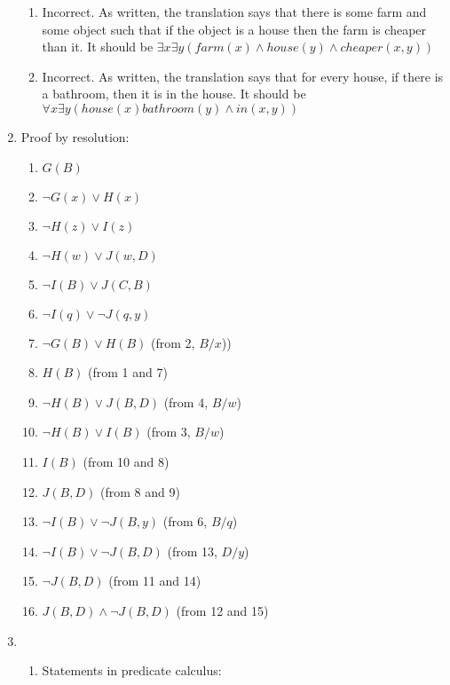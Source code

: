 \documentclass[11pt]{article}
\begin{document}
\begin{enumerate}[label=\bfseries Question \arabic*:]
\begin{enumerate}
  \item Incorrect.  As written, the translation says that there is
    some farm and some object such that if the object is a house then
    the farm is cheaper than it. It should be
    \(\exists x \exists y (farm(x) \land house(y) \land cheaper(x,
    y))\)
  \item Incorrect.  As written, the translation says that for every
    house, if there is a bathroom, then it is in the house.  It should
    be \(\forall x \exists y (house(x) bathroom(y) \land in(x, y))\)
  \end{enumerate}
\item Proof by resolution:
  \begin{enumerate}[label=\arabic*.]
  \item \(G(B)\)
  \item \(\lnot G(x) \lor H(x)\)
  \item \(\lnot H(z) \lor I(z)\)
  \item \(\lnot H(w) \lor J(w, D)\)
  \item \(\lnot I(B) \lor J(C, B)\)
  \item \(\lnot I(q) \lor \lnot J(q, y)\)
  \item \(\lnot G(B) \lor H(B)\) (from 2, \(B/x\)))
  \item \(H(B)\) (from 1 and 7)
  \item \(\lnot H(B) \lor J(B, D)\) (from 4, \(B/w\))
  \item \(\lnot H(B) \lor I(B)\) (from 3, \(B/w\))
  \item \(I(B)\) (from 10 and 8)
  \item \(J(B, D)\) (from 8 and 9)
  \item \(\lnot I(B) \lor \lnot J(B, y)\) (from 6, \(B/q\))
  \item \(\lnot I(B) \lor \lnot J(B, D)\) (from 13, \(D/y\))
  \item \(\lnot J(B, D)\) (from 11 and 14)
  \item \(J(B, D)\land \lnot J(B, D)\) (from 12 and 15)
  \end{enumerate}
\item
  \begin{enumerate}
  \item Statements in predicate calculus:
\end{enumerate}
\end{enumerate}
\end{document}
